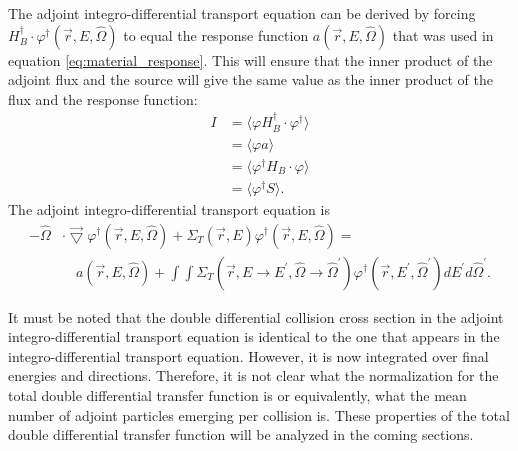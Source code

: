The adjoint integro-differential transport equation can be derived by
forcing $H_B^{\dagger} \cdot \varphi^{\dagger}(\vec{r},E,\hat{\Omega})$ to equal
the response function $a(\vec{r},E,\hat{\Omega})$ that was used in equation
\ref{eq:material_response}. This will ensure that the inner product of the 
adjoint flux and the source will give the same value as the inner product of 
the flux and the response function:
\begin{align}
  I & = \langle \varphi H_B^{\dagger} \cdot \varphi^{\dagger} \rangle \nonumber \\
  & = \langle \varphi a \rangle \nonumber \\
  & = \langle \varphi^{\dagger}H_B \cdot \varphi \rangle \nonumber \\
  & = \langle \varphi^{\dagger} S \rangle \nonumber.
\end{align}
The adjoint integro-differential transport equation is 
\begin{equation}
  \begin{split}
    -\hat{\Omega} &\cdot \vec{\bigtriangledown} 
    \varphi^{\dagger}(\vec{r},E,\hat{\Omega})
    + \Sigma_T(\vec{r},E) \varphi^{\dagger}(\vec{r},E,\hat{\Omega}) = \\
    & \quad a(\vec{r},E,\hat{\Omega}) +
    \int\int \Sigma_T(\vec{r},E \to E^{'},\hat{\Omega} \to \hat{\Omega}^{'})
    \varphi^{\dagger}(\vec{r},E^{'},\hat{\Omega}^{'}) dE^{'}d\hat{\Omega}^{'}.
  \end{split}
  \label{eq:integro_diff_adj_boltzmann_eqn}
\end{equation}

It must be noted that the double differential collision cross section in the
adjoint integro-differential transport equation is identical to the one that
appears in the integro-differential transport equation. However, it is now
integrated over final energies and directions. Therefore, it is not clear what 
the normalization for the total double differential transfer function is or 
equivalently, what the mean number of adjoint particles emerging per collision 
is. These properties of the total double differential transfer function will
be analyzed in the coming sections.

